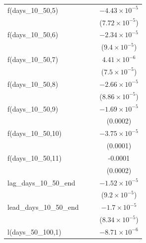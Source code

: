 \begin{tabular}{lccc}
   f(days\_10\_50,5)                &          &                       & $-4.43\times 10^{-5}$\\    
                                    &          &                       & ($7.72\times 10^{-5}$)\\    
   f(days\_10\_50,6)                &          &                       & $-2.34\times 10^{-5}$\\    
                                    &          &                       & ($9.4\times 10^{-5}$)\\    
   f(days\_10\_50,7)                &          &                       & $4.41\times 10^{-6}$\\    
                                    &          &                       & ($7.5\times 10^{-5}$)\\    
   f(days\_10\_50,8)                &          &                       & $-2.66\times 10^{-5}$\\    
                                    &          &                       & ($8.86\times 10^{-5}$)\\    
   f(days\_10\_50,9)                &          &                       & $-1.69\times 10^{-5}$\\    
                                    &          &                       & (0.0002)\\   
   f(days\_10\_50,10)               &          &                       & $-3.75\times 10^{-5}$\\    
                                    &          &                       & (0.0001)\\   
   f(days\_10\_50,11)               &          &                       & -0.0001\\   
                                    &          &                       & (0.0002)\\   
   lag\_days\_10\_50\_end           &          &                       & $-1.52\times 10^{-5}$\\    
                                    &          &                       & ($9.2\times 10^{-5}$)\\    
   lead\_days\_10\_50\_end          &          &                       & $-1.7\times 10^{-5}$\\    
                                    &          &                       & ($8.34\times 10^{-5}$)\\    
   l(days\_50\_100,1)               &          &                       & $-8.71\times 10^{-6}$\\    

\end{tabular}

